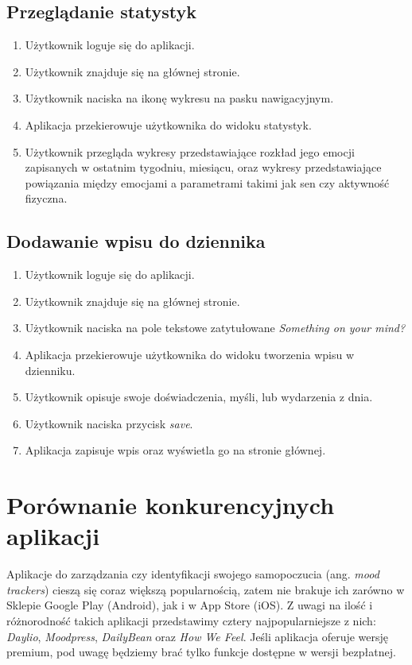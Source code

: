 \documentclass[inz, shortabstract]{iithesis}
\begin{document}
\section{Przeglądanie statystyk}
\begin{enumerate}
	\item Użytkownik loguje się do aplikacji.
	\item Użytkownik znajduje się na głównej stronie.
	\item Użytkownik naciska na ikonę wykresu na pasku nawigacyjnym.
	\item Aplikacja przekierowuje użytkownika do widoku statystyk.
	\item Użytkownik przegląda wykresy przedstawiające rozkład jego emocji zapisanych w ostatnim tygodniu, miesiącu, oraz wykresy przedstawiające powiązania między emocjami a parametrami takimi jak sen czy aktywność fizyczna.
\end{enumerate}

\section{Dodawanie wpisu do dziennika}
\begin{enumerate}
	\item Użytkownik loguje się do aplikacji.
	\item Użytkownik znajduje się na głównej stronie.
	\item Użytkownik naciska na pole tekstowe zatytułowane \textit{Something on your mind?}
	\item Aplikacja przekierowuje użytkownika do widoku tworzenia wpisu w dzienniku.
	\item Użytkownik opisuje swoje doświadczenia, myśli, lub wydarzenia z dnia.
	\item Użytkownik naciska przycisk \textit{save}.
	\item Aplikacja zapisuje wpis oraz wyświetla go na stronie głównej.
\end{enumerate}



\chapter{Porównanie konkurencyjnych aplikacji}
Aplikacje do zarządzania czy identyfikacji swojego samopoczucia (ang. \textit{mood trackers}) cieszą się coraz większą popularnością, zatem nie brakuje ich zarówno w Sklepie Google Play (Android), jak i w App Store (iOS). Z uwagi na ilość i różnorodność takich aplikacji przedstawimy cztery najpopularniejsze z nich: \textit{Daylio}\cite{daylio}, \textit{Moodpress}\cite{moodpress}, \textit{DailyBean}\cite{dailybean} oraz \textit{How We Feel}\cite{howwefeel}. Jeśli aplikacja oferuje wersję premium, pod uwagę będziemy brać tylko funkcje dostępne w wersji bezpłatnej.
\end{document}

